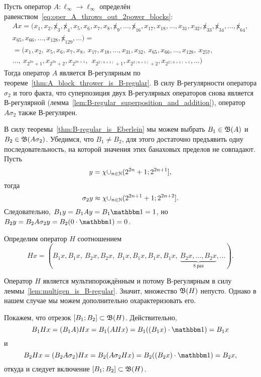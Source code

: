 \begin{example}
	\label{ex:multigen_invariant_interval}
	Пусть оператор $A:\ell_\infty\to\ell_\infty$
	определён равенством~\eqref{eq:oper_A_throws_out_2power_blocks}:
	\begin{multline}
		Ax = (x_1, x_2, \not x_3, \not x_4, x_5, x_6, x_7, x_8, \not x_9, ..., \not x_{16}, x_{17}, x_{18}, ..., x_{31}, x_{32}, \not x_{33}, \not x_{34}, ..., \not x_{64},
		\\
		x_{65}, x_{66}, ..., x_{128}, \not x_{129}, ...)=
		\\=
		(x_1, x_2, \ x_5, x_6, x_7, x_8, \ x_{17}, x_{18}, ..., x_{31}, x_{32}, \ x_{65}, x_{66}, ..., x_{128}, \ x_{257},
		\\
		..., \ x_{2^{2n} +1}, x_{2^{2n} +2},  x_{2^{2n+1}}, \ \ x_{2^{2(n+1)} +1},  x_{2^{2(n+1)} +2},  x_{2^{2(n+1)+1}}, ...)
	\end{multline}
	Тогда оператор $A$ является В-регулярным по теореме~\ref{thm:A_block_thrower_is_B-regular}.
	В силу В-регулярности оператора $\sigma_2$ и того факта,
	что суперпозиция двух В-регулярных операторов снова является В-регулярной (лемма~\ref{lem:B-regular_superposition_and_addition}),
	оператор $A\sigma_2$ также В-регулярен.

	В силу теоремы~\ref{thm:B-regular_is_Eberlein} мы можем выбрать $B_1 \in \mathfrak{B} (A)$ и $B_2 \in \mathfrak{B}(A\sigma_2)$.
	Убедимся, что $B_1 \ne B_2$, для этого достаточно предъявить одну последовательность, на которой
	значения этих банаховых пределов не совпадают.
	Пусть
	\begin{equation}
		y = \chi {\cup_{n\in\ensuremath{\mathbb{N}}}(2^{2n}+1; 2^{2n+1}]}
		,
	\end{equation}
	тогда
	\begin{equation}
		\sigma_2 y \approx \chi {\cup_{n\in\ensuremath{\mathbb{N}}}(2^{2n+1}+1; 2^{2n+2}]}
		.
	\end{equation}
	Следовательно, $B_1y = B_1Ay = B_1\one = 1$, но $B_2y = B_2A\sigma_2 y = B_2(0\cdot \one) = 0$.

	Определим оператор $H$ соотношением
	\begin{equation}
		Hx = (B_1 x, B_1 x, \ B_2 x, B_2 x, \ B_1 x, B_1 x, B_1 x, B_1 x, \ \underbrace{B_2 x, ..., B_2 x}_{8~\mbox{раз}}, ...)
		.
	\end{equation}

	Оператор $H$ является мультипорождённым и потому В-регулярным в силу леммы~\ref{lem:multigen_is_B-regular}.
	Значит, множество $\mathfrak{B}(H)$ непусто.
	Однако в нашем случае мы можем дополнительно охарактеризовать его.

	Покажем, что отрезок $[B_1; B_2]\subset \mathfrak{B}(H)$.
	Действительно,
	\begin{equation}
		B_1 Hx  = (B_1 A) Hx = B_1 (AHx)  = B_1 ((B_1 x) \cdot \one) = B_1 x
	\end{equation}
	и
	\begin{equation}
		B_2 Hx  = (B_2 A\sigma_2) Hx = B_2 (A\sigma_2 Hx)  = B_2 ((B_2 x) \cdot \one) = B_2 x
		,
	\end{equation}
	откуда и следует включение $[B_1; B_2]\subset \mathfrak{B}(H)$.
\end{example}

